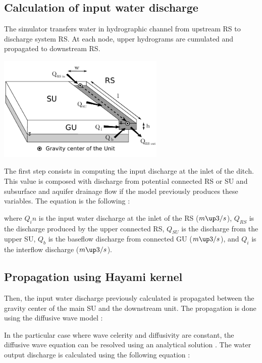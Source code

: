 \subsection{Calculation of input water discharge}
The simulator transfers water in hydrographic channel from upstream RS to discharge system RS. At each node, upper hydrograms are cumulated and propagated to downstream RS.

\includegraphics[width=8cm]{doc/common/Schema_GU_RS_SU_Hayami_RS.pdf}

The first step consists in computing the input discharge at the inlet of the ditch. This value is composed with discharge from potential connected RS or SU and subsurface and aquifer drainage flow if the model previously produces these variables. The equation is the following :



where $Q_in$ is the input water discharge at the inlet of the RS ($m\up3/s$), $Q_{RS}$ is the discharge produced by the upper connected RS, $Q_{SU}$ is the discharge from the upper SU, $Q_b$ is the baseflow discharge from connected GU ($m\up3/s$), and $Q_i$ is the interflow discharge ($m\up3/s$).\\


\subsection{Propagation using Hayami kernel}
Then, the input water discharge previously calculated is propagated between the gravity center of the main SU and the downstream unit. The propagation is done using the diffusive wave model \cite{Moussa1997} :



In the particular case where wave celerity and diffusivity are constant, the diffusive wave equation can be resolved using an analytical solution \cite{Moussa1996}. The water output discharge is calculated using the following equation :

